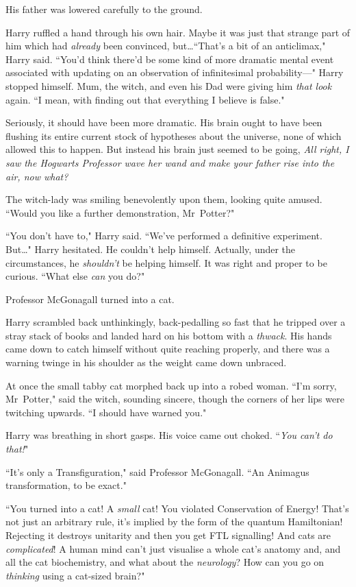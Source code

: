 His father was lowered carefully to the ground.

Harry ruffled a hand through his own hair. Maybe it was just that strange part of him which had \emph{already} been convinced, but…``That's a bit of an anticlimax," Harry said. ``You'd think there'd be some kind of more dramatic mental event associated with updating on an observation of infinitesimal probability—" Harry stopped himself. Mum, the witch, and even his Dad were giving him \emph{that look} again. ``I mean, with finding out that everything I believe is false."

Seriously, it should have been more dramatic. His brain ought to have been flushing its entire current stock of hypotheses about the universe, none of which allowed this to happen. But instead his brain just seemed to be going, \emph{All right, I saw the Hogwarts Professor wave her wand and make your father rise into the air, now what?}

The witch-lady was smiling benevolently upon them, looking quite amused. ``Would you like a further demonstration, Mr~Potter?"

``You don't have to," Harry said. ``We've performed a definitive experiment. But…" Harry hesitated. He couldn't help himself. Actually, under the circumstances, he \emph{shouldn't} be helping himself. It was right and proper to be curious. ``What else \emph{can} you do?"

Professor McGonagall turned into a cat.

Harry scrambled back unthinkingly, back-pedalling so fast that he tripped over a stray stack of books and landed hard on his bottom with a \emph{thwack}. His hands came down to catch himself without quite reaching properly, and there was a warning twinge in his shoulder as the weight came down unbraced.

At once the small tabby cat morphed back up into a robed woman. ``I'm sorry, Mr~Potter," said the witch, sounding sincere, though the corners of her lips were twitching upwards. ``I should have warned you."

Harry was breathing in short gasps. His voice came out choked. ``\emph{You can't \emph{do} that!}"

``It's only a Transfiguration," said Professor McGonagall. ``An Animagus transformation, to be exact."

``You turned into a cat! A \emph{small} cat! You violated Conservation of Energy! That's not just an arbitrary rule, it's implied by the form of the quantum Hamiltonian! Rejecting it destroys unitarity and then you get FTL signalling! And cats are \emph{complicated}! A human mind can't just visualise a whole cat's anatomy and, and all the cat biochemistry, and what about the \emph{neurology}? How can you go on \emph{thinking} using a cat-sized brain?"

